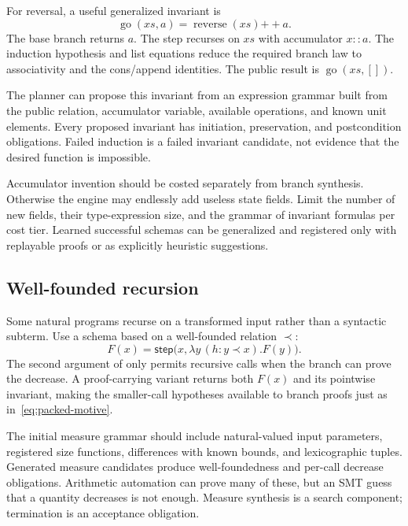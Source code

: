 For reversal, a useful generalized invariant is
\begin{equation}\label{eq:reverse-invariant}
 \operatorname{go}(xs,a)=\operatorname{reverse}(xs)\mathbin{++}a.
\end{equation}
The base branch returns $a$. The step recurses on $xs$ with accumulator $x::a$.
The induction hypothesis and list equations reduce the required branch law to
associativity and the cons/append identities. The public result is
$\operatorname{go}(xs,[])$.

The planner can propose this invariant from an expression grammar built from
the public relation, accumulator variable, available operations, and known
unit elements. Every proposed invariant has initiation, preservation, and
postcondition obligations. Failed induction is a failed invariant candidate,
not evidence that the desired function is impossible.

Accumulator invention should be costed separately from branch synthesis.
Otherwise the engine may endlessly add useless state fields. Limit the number
of new fields, their type-expression size, and the grammar of invariant
formulas per cost tier. Learned successful schemas can be generalized and
registered only with replayable proofs or as explicitly heuristic suggestions.

\subsection{Well-founded recursion}

Some natural programs recurse on a transformed input rather than a syntactic
subterm. Use a schema based on a well-founded relation $\prec$:
\[
 F(x)=\mathsf{step}\bigl(x,\lambda y\,(h:y\prec x).F(y)\bigr).
\]
The second argument of  only permits recursive calls when the branch
can prove the decrease. A proof-carrying variant returns both $F(x)$ and its
pointwise invariant, making the smaller-call hypotheses available to branch
proofs just as in~\eqref{eq:packed-motive}.

The initial measure grammar should include natural-valued input parameters,
registered size functions, differences with known bounds, and lexicographic
tuples. Generated measure candidates produce well-foundedness and per-call
decrease obligations. Arithmetic automation can prove many of these, but an
SMT guess that a quantity decreases is not enough. Measure synthesis is a search
component; termination is an acceptance obligation.


